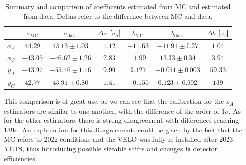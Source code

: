 \begin{table}
\centering
\begin{tabular}{
c |
c |
c |
c |
c |
c |
c }
 & $a_{\text{MC}}$ & $a_{\text{data}}$ &  $\Delta a$ [$\sigma_a$] & $b_{\text{MC}}$ &  $b_{\text{data}}$ &  $\Delta b$ [$\sigma_b$] \\ \hline
    { $x_A$} &
  { $44.29$} &
  { $43.13\pm1.03$} &
  $1.12$ &%
  { $-11.63$} &
  { $-11.91\pm0.27$} &
  $1.04$\\%
    { $x_C$} &
  { $-43.05$} &
  { $-46.62\pm1.26$} &
  $2.83$&%
  { $11.99 $} &
  { $13.33\pm0.34$} &
  $3.94$\\%
    { $y_A$} &
  { $-43.97$} &
  { $-55.46\pm 1.16$} &
  $9.90$ &%
  { $0.127 $} &
  { $-0.051\pm0.003$} &
  $59.33$\\%
    { $y_C$} &
  { $42.77 $} &
  { $43.91\pm0.80 $} &
  $1.41$&%
  { $-0.155$} &
  { $0.123\pm0.002 $} &
  $139$%
\end{tabular}
\caption{Summary and comparison of coefficients estimated from MC and estimated from data. Deltas refer to the difference between MC and data.}\label{tab:comparison_coeff}
\end{table}
This comparison is of great use, as we can see that the calibration for the $x_A$ estimators are similar to one another, with the difference of the order of  $1\sigma$. As for the other estimators, there is strong disagreement with differences reaching $139\sigma$. An explanation for this disagreements could be given by the fact that the MC refers to 2022 conditions and the VELO was fully re-installed after 2023 YETS, thus introducing possible sizeable shifts and changes in detector efficiencies. 



